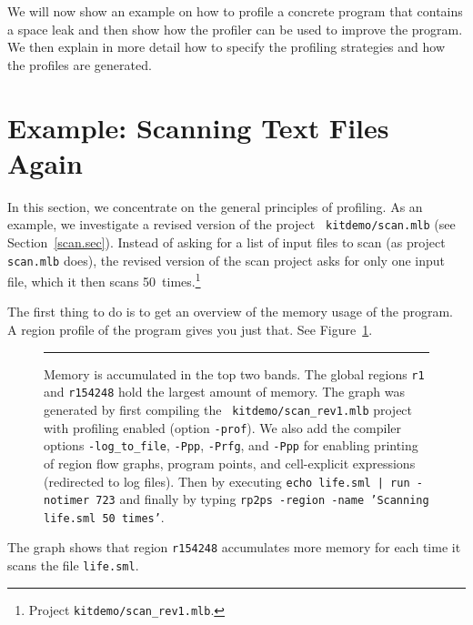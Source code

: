 \documentclass[12pt]{book}
\begin{document}
We will now show an example on how to profile a concrete program that
contains a space leak and then show how the profiler can be used to
improve the program. We then explain in more detail how to specify the
profiling strategies and how the profiles are generated.

\section{Example: Scanning Text Files Again}

In this section, we concentrate on the general principles of
profiling. As an example, we investigate a revised version of the project {\tt
  kitdemo/scan.mlb} (see Section~\ref{scan.sec}). Instead of
asking for a list of input files to scan (as project \texttt{scan.mlb}
does), the revised version of the scan project asks for only one input
file, which it then scans
%
50~times.\footnote{Project {\tt kitdemo/scan\_rev1.mlb}.}

The first thing to do is to get an overview of the memory usage of the
program. A region profile of the program gives you just that. See
Figure~\ref{scan_rev1_1.fig}.
\begin{figure}
\caption{Memory is accumulated in the top two bands. The global
  regions \texttt{r1} and \texttt{r154248} hold the largest amount of
  memory. The graph was generated by first compiling the {\tt
    kitdemo/scan\_rev1.mlb} project with profiling enabled (option
  \texttt{-prof}). We also add the compiler options
  \texttt{-log\_to\_file}, \texttt{-Ppp}, \texttt{-Prfg}, and
  \texttt{-Ppp} for enabling printing of region flow graphs, program
  points, and cell-explicit expressions (redirected to log
  files). Then by executing \texttt{echo life.sml | run -notimer 723}
  and finally by typing \texttt{rp2ps -region -name 'Scanning life.sml
    50 times'}.}
\label{scan_rev1_1.fig}
\medskip\hrule
\end{figure}

The graph shows that region \texttt{r154248} accumulates more memory
for each time it scans the file {\tt life.sml}.
\end{document}
